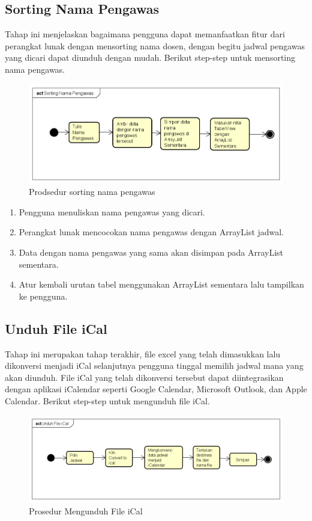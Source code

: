 \subsection{Sorting Nama Pengawas}
Tahap ini menjelaskan bagaimana pengguna dapat memanfaatkan fitur dari perangkat lunak dengan mensorting nama dosen, dengan begitu jadwal pengawas yang dicari dapat diunduh dengan mudah. Berikut step-step untuk mensorting nama pengawas.
\begin{figure}[H]
	\centering
	\includegraphics[scale=0.5]{Gambar/Sorting-Nama-Dosen}
	\caption{Prodsedur sorting nama pengawas}
	\end{figure}

\begin{enumerate}
	\item Pengguna menuliskan nama pengawas yang dicari.
	\item Perangkat lunak mencocokan nama pengawas dengan ArrayList jadwal.
	\item Data dengan nama pengawas yang sama akan disimpan pada ArrayList sementara.
	\item Atur kembali urutan tabel menggunakan ArrayList sementara lalu tampilkan ke pengguna.
\end{enumerate}

\subsection{Unduh File iCal}
Tahap ini merupakan tahap terakhir, file excel yang telah dimasukkan lalu dikonversi menjadi iCal selanjutnya pengguna tinggal memilih jadwal mana yang akan diunduh. File iCal yang telah dikonversi tersebut dapat diintegrasikan dengan aplikasi iCalendar seperti Google Calendar, Microsoft Outlook, dan Apple Calendar. Berikut step-step untuk mengunduh file iCal.
\begin{figure}[h]
	\centering
	\includegraphics[scale=0.5]{Gambar/Unduh-File-iCal}
	\caption{Prosedur Mengunduh File iCal}
	\end{figure}


